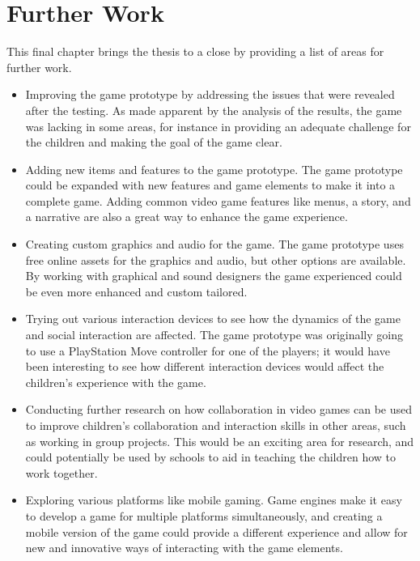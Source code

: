 \chapter{Further Work}
\label{chp:further_work}
This final chapter brings the thesis to a close by providing a list of areas for further work.
\begin{itemize}
	\item Improving the game prototype by addressing the issues that were revealed after the testing. As made apparent by the analysis of the results, the game was lacking in some areas, for instance in providing an adequate challenge for the children and making the goal of the game clear.
	
	\item Adding new items and features to the game prototype. The game prototype could be expanded with new features and game elements to make it into a complete game. Adding common video game features like menus, a story, and a narrative are also a great way to enhance the game experience.
	
	\item Creating custom graphics and audio for the game. The game prototype uses free online assets for the graphics and audio, but other options are available. By working with graphical and sound designers the game experienced could be even more enhanced and custom tailored.
	
	\item Trying out various interaction devices to see how the dynamics of the game and social interaction are affected. The game prototype was originally going to use a PlayStation Move controller for one of the players; it would have been interesting to see how different interaction devices would affect the children's experience with the game.
	
	\item Conducting further research on how collaboration in video games can be used to improve children's collaboration and interaction skills in other areas, such as working in group projects. This would be an exciting area for research, and could potentially be used by schools to aid in teaching the children how to work together.
	
	\item Exploring various platforms like mobile gaming. Game engines make it easy to develop a game for multiple platforms simultaneously, and creating a mobile version of the game could provide a different experience and allow for new and innovative ways of interacting with the game elements.
	

\end{itemize}
